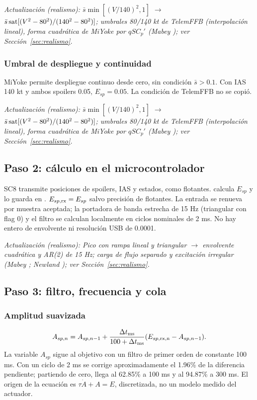 \textit{Actualización (realismo): $\bar s\min[(V/140)^2,1]$ $\rightarrow$ $\bar s\operatorname{sat}[(V^2-80^2)/(140^2-80^2)]$; umbrales 80/140 kt de TelemFFB (interpolación lineal), forma cuadrática de MiYoke por $qSC_p'$ (Mabey \cite{mabey1988}); ver Sección~\ref{sec:realismo}.}

\subsubsection{Umbral de despliegue y continuidad}
MiYoke permite despliegue continuo desde cero, sin condición $\bar s>0.1$. Con IAS 140 kt y ambos spoilers 0.05, $E_{sp}=0.05$. La condición de TelemFFB no se copió.

\textit{Actualización (realismo): $\bar s\min[(V/140)^2,1]$ $\rightarrow$ $\bar s\operatorname{sat}[(V^2-80^2)/(140^2-80^2)]$; umbrales 80/140 kt de TelemFFB (interpolación lineal), forma cuadrática de MiYoke por $qSC_p'$ (Mabey \cite{mabey1988}); ver Sección~\ref{sec:realismo}.}

\subsection{Paso 2: cálculo en el microcontrolador}
SC8 transmite posiciones de spoilers, IAS y estados, como flotantes.  calcula $E_{sp}$ y lo guarda en . $E_{sp,\rm rx}=E_{sp}$ salvo precisión de flotantes. La entrada se renueva por muestra aceptada; la portadora de banda estrecha de 15 Hz (triangular con flag 0) y el filtro se calculan localmente en ciclos nominales de 2 ms. No hay entero de envolvente ni resolución USB de 0.0001.

\textit{Actualización (realismo): Pico con rampa lineal y triangular $\rightarrow$ envolvente cuadrática y AR(2) de 15 Hz; carga de flujo separado y excitación irregular (Mabey \cite{mabey1988}; Newland \cite{newland1993}); ver Sección~\ref{sec:realismo}.}

\subsection{Paso 3: filtro, frecuencia y cola}
\subsubsection{Amplitud suavizada}
\begin{equation}
A_{sp,n}=A_{sp,n-1}+\frac{\Delta t_{\rm ms}}{100+\Delta t_{\rm ms}}
(E_{sp,\rm rx,n}-A_{sp,n-1}).
\end{equation}
La variable $A_{sp}$ sigue al objetivo con un filtro de primer orden de constante 100 ms. Con un ciclo de 2 ms se corrige aproximadamente el 1.96\% de la diferencia pendiente; partiendo de cero, llega al 62.85\% a 100 ms y al 94.87\% a 300 ms. El origen de la ecuación es $\tau\dot A+A=E$, discretizada, no un modelo medido del actuador.



